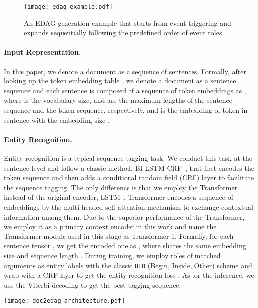 \documentclass[11pt,a4paper]{article}
\begin{document}
\begin{figure}[t]
\centering
\texttt{[image: edag\_example.pdf]}
\caption{An EDAG generation example that starts from event triggering and expands sequentially following the predefined order of event roles.}
\label{fig:edag_example}
\end{figure}


\paragraph{Input Representation.}
In this paper, we denote a document as a sequence of sentences.
Formally, after looking up the token embedding table ,
we denote a document  as a sentence sequence  and each sentence  is composed of a sequence of token embeddings as ,
where  is the vocabulary size,
 and  are the maximum lengths of the sentence sequence and the token sequence, respectively, 
and  is the embedding of  token in  sentence with the embedding size .


\paragraph{Entity Recognition.}
Entity recognition is a typical sequence tagging task.
We conduct this task at the sentence level and follow a classic method, BI-LSTM-CRF~\cite{huang2015bidirectional}, that first encodes the token sequence and then adds a conditional random field (CRF) layer to facilitate the sequence tagging.
The only difference is that we employ the Transformer~\cite{vaswani2017attention} instead of the original encoder, LSTM~\cite{hochreiter1997long}.
Transformer encodes a sequence of embeddings by the multi-headed self-attention mechanism to exchange contextual information among them.
Due to the superior performance of the Transformer, we employ it as a primary context encoder in this work and name the Transformer module used in this stage as Transformer-1.
Formally, for each sentence tensor ,
we get the encoded one as ,
where  shares the same embedding size  and sequence length .
During training, we employ roles of matched arguments as entity labels with the classic \texttt{BIO} (Begin, Inside, Other) scheme and wrap  with a CRF layer to get the entity-recognition loss .
As for the inference, we use the Viterbi decoding to get the best tagging sequence.

\begin{figure*}[ht]
\centering
\texttt{[image: doc2edag-architecture.pdf]}
\caption{The overall workflow of Doc2EDAG, where we follow the example in Figure~\ref{fig:pledge_example} and the EDAG structure in Figure~\ref{fig:edag_example}, and use stripes to differentiate different entities (note that the number of input tokens and entity positions are imaginary, which do not match previous ones strictly, and here we only include the first three event roles and associated entities for brevity).}
\label{fig:architecture}
\end{figure*}
\end{document}
